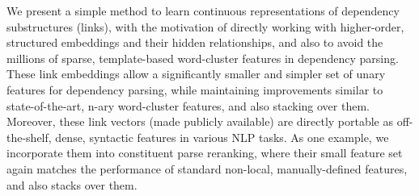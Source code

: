 We present a simple method to learn continuous representations of dependency substructures (links), with the motivation of directly working with higher-order, structured embeddings and their hidden relationships, and also to avoid the millions of sparse, template-based word-cluster features in dependency parsing.  These link embeddings allow a significantly smaller and simpler set of unary features for dependency parsing, while maintaining improvements similar to state-of-the-art, n-ary word-cluster features, and also stacking over them. Moreover, these link vectors (made publicly available) are directly portable as off-the-shelf, dense, syntactic features in various NLP tasks. As one example, we incorporate them into constituent parse reranking, where their small feature set again matches the performance of standard non-local, manually-defined features, and also stacks over them.
